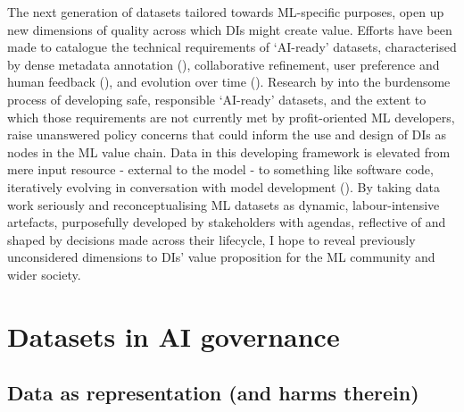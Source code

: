 The next generation of datasets tailored towards ML-specific purposes, open up new dimensions of quality across which DIs might create value. Efforts have been made to catalogue the technical requirements of ‘AI-ready’ datasets, characterised by dense metadata annotation (\cite{gebru2021DatasheetsDatasetsa, han2023NeglectedFreeLunch}), collaborative refinement, user preference and human feedback (\cite{kirstain2023PickaPicOpenDataset}), and evolution over time (\cite{schuhmann2022LAION5BOpenLargescale}). Research by \textcite{priestley2023SurveyDataQuality} into the burdensome process of developing safe, responsible ‘AI-ready’ datasets, and the extent to which those requirements are not currently met by profit-oriented ML developers, raise unanswered policy concerns that could inform the use and design of DIs as nodes in the ML value chain. Data in this developing framework is elevated from mere input resource - external to the model - to something like software code, iteratively evolving in conversation with model development (\cite{ jakubik2024DataCentricArtificialIntelligence}). By taking data work seriously and reconceptualising ML datasets as dynamic, labour-intensive artefacts, purposefully developed by stakeholders with agendas, reflective of and shaped by decisions made across their lifecycle, I hope to reveal previously unconsidered dimensions to DIs' value proposition for the ML community and wider society.

\section*{Datasets in AI governance}

\subsection*{Data as representation (and harms therein)}

